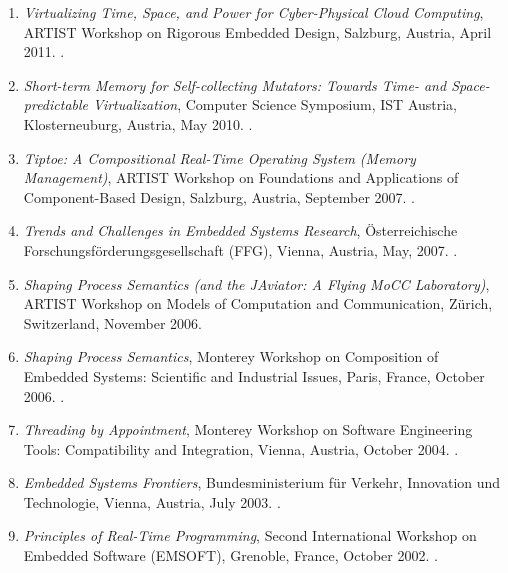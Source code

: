 {\begin{enumerate}
\item \emph{Virtualizing Time, Space, and Power for Cyber-Physical Cloud Computing},
ARTIST Workshop on Rigorous Embedded Design, Salzburg, Austria, April 2011.
.

\item \emph{Short-term Memory for Self-collecting Mutators: Towards Time- and Space-predictable Virtualization},
Computer Science Symposium, IST Austria, Klosterneuburg, Austria, May 2010.
.

\item \emph{Tiptoe: A Compositional Real-Time Operating System (Memory Management)},
ARTIST Workshop on Foundations and Applications of Component-Based Design, Salzburg, Austria, September 2007.
.

\item \emph{Trends and Challenges in Embedded Systems Research},
{\"O}sterreichische Forschungsf{\"o}rderungsgesellschaft (FFG), Vienna, Austria, May, 2007.
.

\item \emph{Shaping Process Semantics (and the JAviator: A Flying MoCC Laboratory)},
ARTIST Workshop on Models of Computation and Communication, Z{\"u}rich, Switzerland, November 2006.

\item \emph{Shaping Process Semantics},
Monterey Workshop on Composition of Embedded Systems: Scientific and Industrial Issues,
Paris, France, October 2006.
.

\item \emph{Threading by Appointment},
Monterey Workshop on Software Engineering Tools: Compatibility and Integration, Vienna, Austria, October 2004.
.

\item \emph{Embedded Systems Frontiers},
Bundesministerium f{\"u}r Verkehr, Innovation und Technologie, Vienna, Austria, July 2003.
.

\item \emph{Principles of Real-Time Programming},
Second International Workshop on Embedded Software (EMSOFT), Grenoble, France, October 2002.
.
\end{enumerate}
}


